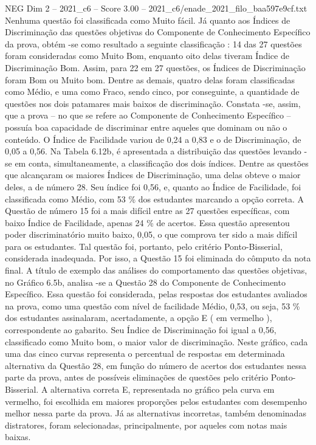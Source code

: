 \begin{textsample}{NEG Dim 2 – 2021\_c6 – Score 3.00 – 2021\_c6/enade\_2021\_filo\_baa597e9cf.txt}
Nenhuma questão foi classificada como Muito fácil.
Já quanto aos Índices de Discriminação das questões objetivas do Componente de Conhecimento Específico da prova, obtém -se como resultado a seguinte classificação : 14 das 27 questões foram consideradas como Muito Bom, enquanto oito delas tiveram Índice de Discriminação Bom.
Assim, para 22 em 27 questões, os Índices de Discriminação foram Bom ou Muito bom.
Dentre as demais, quatro delas foram classificadas como Médio, e uma como Fraco, sendo cinco, por conseguinte, a quantidade de questões nos dois patamares mais baixos de discriminação.
Constata -se, assim, que a prova – no que se refere ao Componente de Conhecimento Específico – possuía boa capacidade de discriminar entre aqueles que dominam ou não o conteúdo.
O Índice de Facilidade variou de 0,24 a 0,83 e o de Discriminação, de 0,05 a 0,56.
Na Tabela 6.12b, é apresentada a distribuição das questões levando -se em conta, simultaneamente, a classificação dos dois índices.
Dentre as questões que alcançaram os maiores Índices de Discriminação, uma delas obteve o maior deles, a de número 28.
Seu índice foi 0,56, e, quanto ao Índice de Facilidade, foi classificada como Médio, com 53 \% dos estudantes marcando a opção correta.
A Questão de número 15 foi a mais difícil entre as 27 questões específicas, com baixo Índice de Facilidade, apenas 24 \% de acertos.
Essa questão apresentou poder discriminatório muito baixo, 0,05, o que comprova ter sido a mais difícil para os estudantes.
Tal questão foi, portanto, pelo critério Ponto-Bisserial, considerada inadequada.
Por isso, a Questão 15 foi eliminada do cômputo da nota final.
A título de exemplo das análises do comportamento das questões objetivas, no Gráfico 6.5b, analisa -se a Questão 28 do Componente de Conhecimento Específico.
Essa questão foi considerada, pelas respostas dos estudantes avaliados na prova, como uma questão com nível de facilidade Médio, 0,53, ou seja, 53 \% dos estudantes assinalaram, acertadamente, a opção E ( em vermelho ), correspondente ao gabarito.
Seu Índice de Discriminação foi igual a 0,56, classificado como Muito bom, o maior valor de discriminação.
Neste gráfico, cada uma das cinco curvas representa o percentual de respostas em determinada alternativa da Questão 28, em função do número de acertos dos estudantes nessa parte da prova, antes de possíveis eliminações de questões pelo critério Ponto-Bisserial.
A alternativa correta E, representada no gráfico pela curva em vermelho, foi escolhida em maiores proporções pelos estudantes com desempenho melhor nessa parte da prova.
Já as alternativas incorretas, também denominadas distratores, foram selecionadas, principalmente, por aqueles com notas mais baixas.

\end{textsample}
